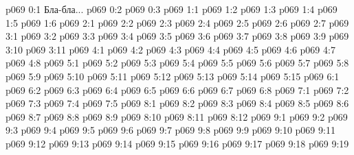 \author{Мелхиседек}
\vs p069 0:1  Бла-бла...
\vs p069 0:2 
\vs p069 0:3 
\vs p069 1:1 
\vs p069 1:2 \pc 
\vs p069 1:3 
\vs p069 1:4 
\vs p069 1:5 
\vs p069 1:6 \pc 
{}
\vs p069 2:1 
\vs p069 2:2 
\vs p069 2:3 
\vs p069 2:4 
\vs p069 2:5 
\vs p069 2:6 
\vs p069 2:7 
\vs p069 3:1 
\vs p069 3:2 
\vs p069 3:3 \pc 
\vs p069 3:4 
\vs p069 3:5 
\vs p069 3:6 
\vs p069 3:7 
\vs p069 3:8 
\vs p069 3:9 
\vs p069 3:10 \pc 
\vs p069 3:11 
\vs p069 4:1 
\vs p069 4:2 
\vs p069 4:3 
\vs p069 4:4 
\vs p069 4:5 \pc 
\vs p069 4:6 
\vs p069 4:7 
\vs p069 4:8 
\vs p069 5:1 
\vs p069 5:2 
\vs p069 5:3 
\vs p069 5:4 
\vs p069 5:5 
\vs p069 5:6 
\vs p069 5:7 
\vs p069 5:8 
\vs p069 5:9 
\vs p069 5:10 
\vs p069 5:11 
\vs p069 5:12 \pc 
\vs p069 5:13 
\vs p069 5:14 
\vs p069 5:15 
\vs p069 6:1 
\vs p069 6:2 
\vs p069 6:3 
\vs p069 6:4 \pc 
\vs p069 6:5 
\vs p069 6:6 
\vs p069 6:7 \pc 
\vs p069 6:8 
\vs p069 7:1 
\vs p069 7:2 
\vs p069 7:3 
\vs p069 7:4 
\vs p069 7:5 
\vs p069 8:1 
\vs p069 8:2 
\vs p069 8:3 
\vs p069 8:4 
\vs p069 8:5 
\vs p069 8:6 \pc 
\vs p069 8:7 
\vs p069 8:8 
\vs p069 8:9 \pc 
\vs p069 8:10 \pc 
\vs p069 8:11 
\vs p069 8:12 
\vs p069 9:1 
\vs p069 9:2 \pc 
\vs p069 9:3 
\vs p069 9:4 
\vs p069 9:5 
\vs p069 9:6 
\vs p069 9:7 
\vs p069 9:8 
\vs p069 9:9 
\vs p069 9:10 
\vs p069 9:11 \pc 
\vs p069 9:12 
\vs p069 9:13 
\vs p069 9:14 
\vs p069 9:15 
\vs p069 9:16 
\vs p069 9:17 
\vs p069 9:18 
\vsetoff
\vs p069 9:19 
\quizlink
